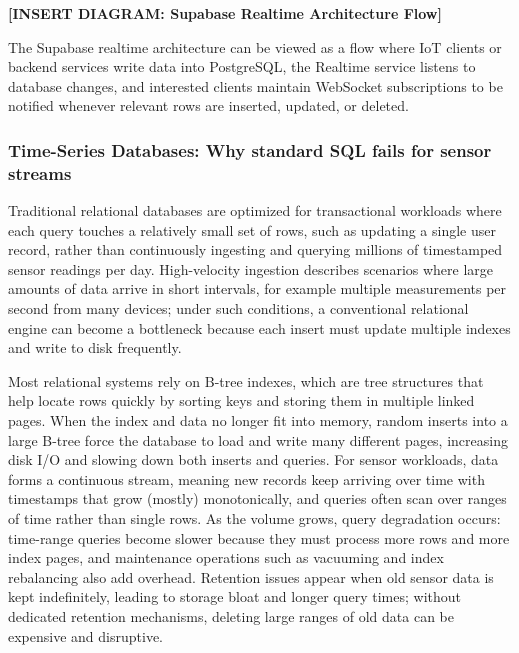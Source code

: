\textbf{[INSERT DIAGRAM: Supabase Realtime Architecture Flow]}

The Supabase realtime architecture can be viewed as a flow where IoT clients or backend services write data into PostgreSQL, the Realtime service listens to database changes, and interested clients maintain WebSocket subscriptions to be notified whenever relevant rows are inserted, updated, or deleted.\cite{blog_elest_supabase_self_host, bejamas_serverless_supabase}

\subsubsection{Time-Series Databases: Why standard SQL fails for sensor streams}
Traditional relational databases are optimized for transactional workloads where each query touches a relatively small set of rows, such as updating a single user record, rather than continuously ingesting and querying millions of timestamped sensor readings per day. High-velocity ingestion describes scenarios where large amounts of data arrive in short intervals, for example multiple measurements per second from many devices; under such conditions, a conventional relational engine can become a bottleneck because each insert must update multiple indexes and write to disk frequently.\cite{tigerdata_tsdb_vs_rdbms, cratedb_tsdb_vs_rdbms}

Most relational systems rely on B-tree indexes, which are tree structures that help locate rows quickly by sorting keys and storing them in multiple linked pages. When the index and data no longer fit into memory, random inserts into a large B-tree force the database to load and write many different pages, increasing disk I/O and slowing down both inserts and queries. For sensor workloads, data forms a continuous stream, meaning new records keep arriving over time with timestamps that grow (mostly) monotonically, and queries often scan over ranges of time rather than single rows. As the volume grows, query degradation occurs: time-range queries become slower because they must process more rows and more index pages, and maintenance operations such as vacuuming and index rebalancing also add overhead. Retention issues appear when old sensor data is kept indefinitely, leading to storage bloat and longer query times; without dedicated retention mechanisms, deleting large ranges of old data can be expensive and disruptive.\cite{cratedb_tsdb_vs_rdbms, tigerdata_tsdb_vs_rdbms}

